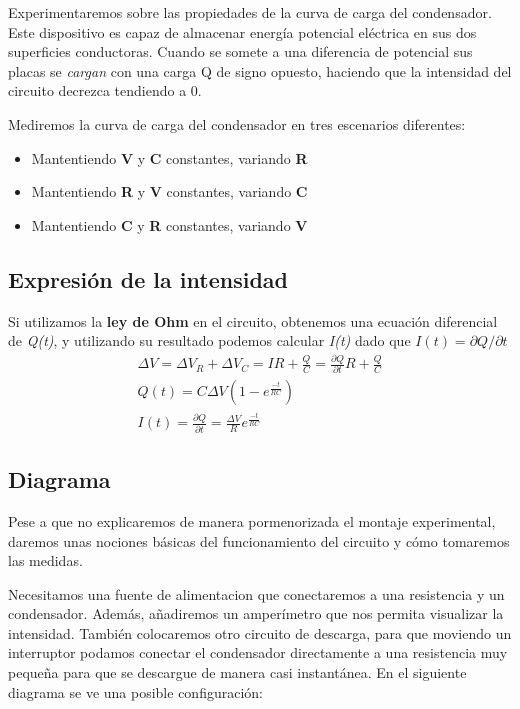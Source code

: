 \documentclass[12pt, a4paper, titlepage]{article}
\begin{document}
  Experimentaremos sobre las propiedades de la curva de carga del condensador. Este dispositivo es capaz de almacenar energía potencial eléctrica en sus dos superficies conductoras. Cuando se somete a una diferencia de potencial sus placas se \textit{cargan} con una carga Q de signo opuesto, haciendo que la intensidad del circuito decrezca tendiendo a 0.

  Mediremos la curva de carga del condensador en tres escenarios diferentes:

  \begin{itemize}[label=$-$]
    \item Mantentiendo \textbf{V} y \textbf{C} constantes, variando \textbf{R}
    \item Mantentiendo \textbf{R} y \textbf{V} constantes, variando \textbf{C}
    \item Mantentiendo \textbf{C} y \textbf{R} constantes, variando \textbf{V}
  \end{itemize}

  \subsection{Expresión de la intensidad}

  Si utilizamos la \textbf{ley de Ohm} en el circuito, obtenemos una ecuación diferencial de \textit{Q(t)}, y utilizando su resultado podemos calcular \textit{I(t)} dado que $I(t) = \partial Q /\partial t$
  \begin{gather}
    \Delta V = \Delta V_R + \Delta V_C = IR + \frac{Q}{C} = \frac{\partial Q}{\partial t}R + \frac{Q}{C} \nonumber \\
    Q(t) = C \Delta V (1-e^{\frac{-t}{RC}}) \nonumber \\
    I(t) = \frac{\partial Q}{\partial t} = \frac{\Delta V}{R} e^{\frac{-t}{RC}} \label{ec:i}
  \end{gather}

  \subsection{Diagrama}

  Pese a que no explicaremos de manera pormenorizada el montaje experimental, daremos unas nociones básicas del funcionamiento del circuito y cómo tomaremos las medidas.

  Necesitamos una fuente de alimentacion que conectaremos a una resistencia y un condensador. Además, añadiremos un amperímetro que nos permita visualizar la intensidad. También colocaremos otro circuito de descarga, para que moviendo un interruptor podamos conectar el condensador directamente a una resistencia muy pequeña para que se descargue de manera casi instantánea. En el siguiente diagrama se ve una posible configuración:
\end{document}

